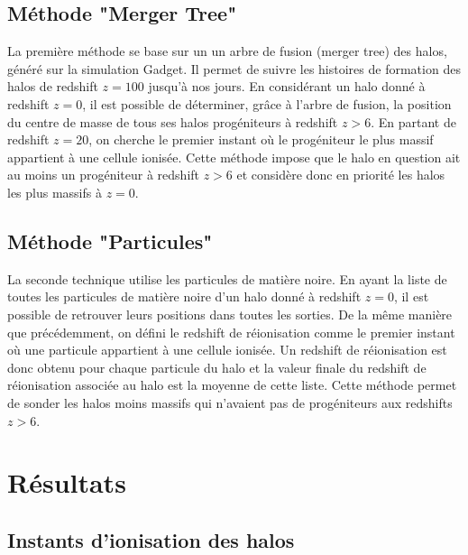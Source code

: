 \subsection{Méthode "Merger Tree"}
La première méthode se base sur un un arbre de fusion (merger tree) des halos, généré sur la simulation Gadget.
Il permet de suivre les histoires de formation des halos de redshift $z=100$ jusqu'à nos jours.
En considérant un halo donné à redshift $z=0$, il est possible de déterminer, grâce à l'arbre de fusion, la position du centre de masse de tous ses halos progéniteurs à redshift $z>6$.
En partant de redshift $z=20$, on cherche le premier instant où le progéniteur le plus massif appartient à une cellule ionisée.
Cette méthode impose que le halo en question ait au moins un progéniteur à redshift $z>6$ et considère donc en priorité les halos les plus massifs à $z=0$.

\subsection{Méthode "Particules"}
La seconde technique utilise les particules de matière noire.
En ayant la liste de toutes les particules de matière noire d'un halo donné à redshift $z=0$, il est possible de retrouver leurs positions dans toutes les sorties.
De la même manière que précédemment, on défini le redshift de réionisation comme le premier instant où une particule appartient à une cellule ionisée.
Un redshift de réionisation est donc obtenu pour chaque particule du halo et la valeur finale du redshift de réionisation associée au halo est la moyenne de cette liste.
Cette méthode permet de sonder les halos moins massifs qui n'avaient pas de progéniteurs aux redshifts $z>6$.

\section{Résultats}


\subsection{Instants d'ionisation des halos}

